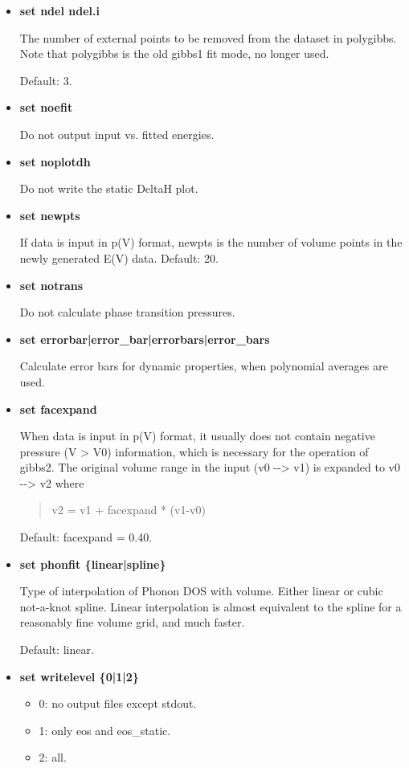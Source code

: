 \documentclass[a4paper]{article}
\begin{document}
\begin{itemize}
\item \textbf{set ndel ndel.i}

The number of external points to be removed from the dataset in
polygibbs. Note that polygibbs is the old gibbs1 fit mode, no longer
used.

Default: 3.

\item \textbf{set noefit}

Do not output input vs. fitted energies.

\item \textbf{set noplotdh}

Do not write the static DeltaH plot.

\item \textbf{set newpts}

If data is input in p(V) format, newpts is the number of volume
points in the newly generated E(V) data. Default: 20.

\item \textbf{set notrans}

Do not calculate phase transition pressures.

\item \textbf{set errorbar|error\_bar|errorbars|error\_bars}

Calculate error bars for dynamic properties, when polynomial
averages are used.

\item \textbf{set facexpand}

When data is input in p(V) format, it usually does not contain
negative pressure (V > V0) information, which is necessary for the
operation of gibbs2. The original volume range in the input (v0 -{}->
v1) is expanded to v0 -{}-> v2 where
%
\begin{quote}

v2 = v1 + facexpand * (v1-v0)

\end{quote}

Default: facexpand = 0.40.

\item \textbf{set phonfit \{linear|spline\}}

Type of interpolation of Phonon DOS with volume. Either linear or
cubic not-a-knot spline. Linear interpolation is almost equivalent
to the spline for a reasonably fine volume grid, and much faster.

Default: linear.

\item \textbf{set writelevel \{0|1|2\}}
%
\begin{itemize}

\item 0: no output files except stdout.

\item 1: only eos and eos\_static.

\item 2: all.

\end{itemize}

\end{itemize}
\end{document}
